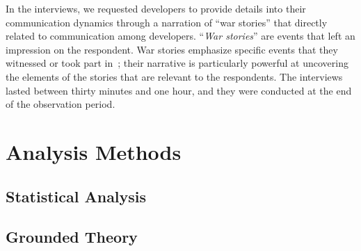 In the interviews, we requested developers to provide details into their communication dynamics through a narration of ``war stories'' that directly related to communication among developers. ``\emph{War stories}'' are events that left an impression on the respondent. War stories emphasize specific events that they witnessed or took part in~\cite{lutters:ist:2007}; their narrative is particularly powerful at uncovering the elements of the stories that are relevant to the respondents. The interviews lasted between thirty minutes and one hour, and they were conducted at the end of the observation period. 


\section{Analysis Methods}
\subsection{Statistical Analysis}
\subsection{Grounded Theory}













